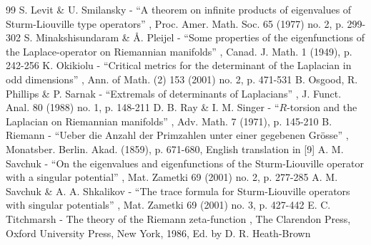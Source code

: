 \documentclass[11pt]{article}
\theoremstyle{plain}
\theoremstyle{definition}
\begin{document}
\begin{thebibliography}{99}
 S. Levit \& U. Smilansky - “A theorem on infinite products of eigenvalues of Sturm-Liouville type operators” , Proc. Amer. Math. Soc. 65 (1977) no. 2, p. 299-302
 S. Minakshisundaram \& Å. Pleijel - “Some properties of the eigenfunctions of the Laplace-operator on Riemannian manifolds” , Canad. J. Math. 1 (1949), p. 242-256
 K. Okikiolu - “Critical metrics for the determinant of the Laplacian in odd dimensions” , Ann. of Math. (2) 153 (2001) no. 2, p. 471-531
 B. Osgood, R. Phillips \& P. Sarnak - “Extremals of determinants of Laplacians” , J. Funct. Anal. 80 (1988) no. 1, p. 148-211
 D. B. Ray \& I. M. Singer - “$R$-torsion and the Laplacian on Riemannian manifolds” , Adv. Math. 7 (1971), p. 145-210
 B. Riemann - “Ueber die Anzahl der Primzahlen unter einer gegebenen Grösse” , Monatsber. Berlin. Akad. (1859), p. 671-680, English translation in [9]
 A. M. Savchuk - “On the eigenvalues and eigenfunctions of the Sturm-Liouville operator with a singular potential” , Mat. Zametki 69 (2001) no. 2, p. 277-285
 A. M. Savchuk \& A. A. Shkalikov - “The trace formula for Sturm-Liouville operators with singular potentials” , Mat. Zametki 69 (2001) no. 3, p. 427-442
 E. C. Titchmarsh - The theory of the Riemann zeta-function , The Clarendon Press, Oxford University Press, New York, 1986, Ed. by D. R. Heath-Brown
\end{thebibliography}
\end{document}
